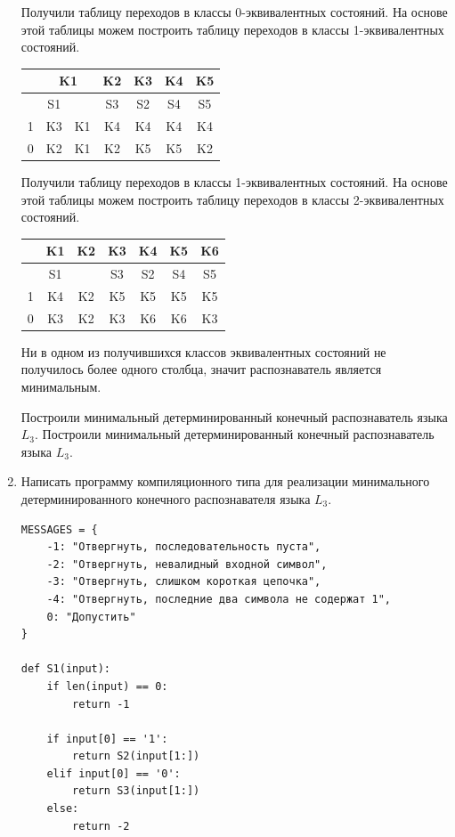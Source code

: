 \documentclass[a4paper,14pt]{extarticle}
\begin{document}
\begin{enumerate}[1.]
Получили таблицу переходов в классы 0-эквивалентных состояний. На основе 
этой таблицы можем построить таблицу переходов в классы 1-эквивалентных 
состояний. 

\begin{tabular}{|c|c|c|c|c|c|c|}
    \hline
    & \multicolumn{2}{c|}{K1} & K2 & K3 & K4 & K5 \\
    \hline
      & S1 &    & S3 & S2 & S4 & S5 \\
    \hline
    1 & K3 & K1 & K4 & K4 & K4 & K4 \\
    \hline
    0 & K2 & K1 & K2 & K5 & K5 & K2 \\
    \hline
\end{tabular}

Получили таблицу переходов в классы 1-эквивалентных состояний. На основе 
этой таблицы можем построить таблицу переходов в классы 2-эквивалентных 
состояний. 

\begin{tabular}{|c|c|c|c|c|c|c|}
    \hline
      & K1 & K2 & K3 & K4 & K5 & K6 \\
    \hline
      & S1 &    & S3 & S2 & S4 & S5 \\
    \hline
    1 & K4 & K2 & K5 & K5 & K5 & K5 \\
    \hline
    0 & K3 & K2 & K3 & K6 & K6 & K3 \\
    \hline
\end{tabular}

Ни в одном из получившихся классов эквивалентных состояний не получилось
более одного столбца, значит распознаватель является минимальным. 

Построили минимальный детерминированный конечный распознаватель языка $L_3$.
\fi
Построили минимальный детерминированный конечный распознаватель языка $L_3$.
\item Написать программу компиляционного типа для реализации
минимального детерминированного конечного распознавателя языка $L_3$.

\begin{verbatim}
MESSAGES = {
    -1: "Отвергнуть, последовательность пуста",
    -2: "Отвергнуть, невалидный входной символ",
    -3: "Отвергнуть, слишком короткая цепочка",
    -4: "Отвергнуть, последние два символа не содержат 1",
    0: "Допустить"
}

def S1(input):
    if len(input) == 0:
        return -1

    if input[0] == '1':
        return S2(input[1:])
    elif input[0] == '0':
        return S3(input[1:])
    else:
        return -2


\end{verbatim}
\end{enumerate}
\end{document}
